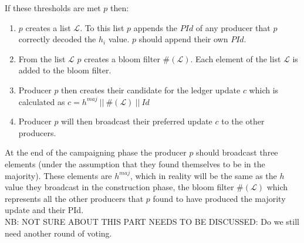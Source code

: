 If these thresholds are met $p$ then:
\begin{enumerate}
\item $p$ creates a list $\mathcal{L}$. To this list $p$ appends the $PId$ of any producer that $p$ correctly decoded the $h_i$ value. $p$ should append their own $PId$.
\item From the list $\mathcal{L}$ $p$ creates a bloom filter $\#(\mathcal{L})$. Each element of the list  $\mathcal{L}$ is added to the bloom filter. 
\item Producer $p$ then creates their candidate for the ledger update $c$ which is calculated as $c = h^{maj}~||~\#(\mathcal{L})~||~Id$
\item Producer $p$ will then broadcast their preferred update $c$ to the other producers.
\end{enumerate}

At the end of the campaigning phase the producer $p$ should broadcast three elements (under the assumption that they found themselves to be in the majority). These elements are $h^{maj}$, which in reality will be the same as the $h$ value they broadcast in the construction phase, the bloom filter $\#(\mathcal{L})$ which represents all the other producers that $p$ found to have produced the majority update and their PId. \\


NB: NOT SURE ABOUT THIS PART NEEDS TO BE DISCUSSED: Do we still need another round of voting. 



